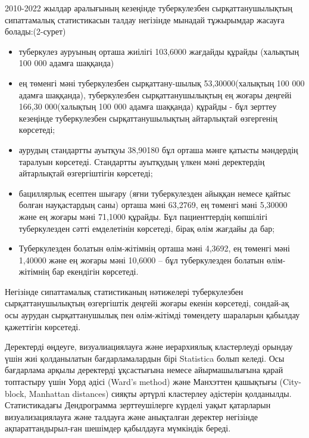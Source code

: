 \begin{multicols}{2}

2010-2022 жылдар аралығының кезеңінде туберкулезбен сырқаттанушылықтың
сипаттамалық статистикасын талдау негізінде мынадай тұжырымдар жасауға
болады:(2-сурет)

\begin{itemize}
  \setlength{\itemindent}{1cm}
\item
  туберкулез ауруының орташа жиілігі 103,6000 жағдайды құрайды (халықтың
  100 000 адамға шаққанда)
\item
  ең төменгі мәні туберкулезбен сырқаттану-шылық 53,30000(халықтың 100
  000 адамға шаққанда), туберкулезбен сырқаттанушылықтың ең жоғары
  деңгейі 166,30 000(халықтың 100 000 адамға шаққанда) құрайды - бұл
  зерттеу кезеңінде туберкулезбен сырқаттанушылықтың айтарлықтай
  өзгергенің көрсетеді;
\item
  аурудың стандартты ауытқуы 38,90180 бұл орташа мәнге қатысты мәндердің
  таралуын көрсетеді. Стандартты ауытқудың үлкен мәні деректердің
  айтарлықтай өзгергіштігін көрсетеді;
\item
  бациллярлық есептен шығару (яғни туберкулезден айыққан немесе қайтыс
  болған науқастардың саны) орташа мәні 63,2769, ең төменгі мәні 5,30000
  және ең жоғары мәні 71,1000 құрайды. Бұл пациенттердің көпшілігі
  туберкулезден сәтті емделетінін көрсетеді, бірақ өлім жағдайы да бар;
\item
  Туберкулезден болатын өлім-жітімнің орташа мәні 4,3692, ең төменгі
  мәні 1,40000 және ең жоғары мәні 10,6000 -- бұл туберкулезден болатын
  өлім-жітімнің бар екендігін көрсетеді.
\end{itemize}

Негізінде сипаттамалық статистиканың нәтижелері туберкулезбен
сырқаттанушылықтың өзгергіштік деңгейі жоғары екенін көрсетеді,
сондай-ақ осы аурудан сырқаттанушылық пен өлім-жітімді төмендету
шараларын қабылдау қажеттігін көрсетеді.

Деректерді өңдеуге, визуалиациялауға және иерархиялық кластерлеуді
орындау үшін жиі қолданылатын бағдарламалардын бірі Statistica болып
келеді. Осы бағдарлама арқылы деректерді ұқсастығына немесе
айырмашылығына қарай топтастыру үшін Уорд әдісі (Ward's method) және
Манхэттен қашықтығы (City-block, Manhattan distances) сияқты әртүрлі
кластерлеу әдістерін қолданылды. Статистикадағы Дендрограмма
зерттеушілерге күрделі уақыт қатарларын визуализациялауға және талдауға
және анықталған деректер негізінде ақпараттандырыл-ған шешімдер
қабылдауға мүмкіндік береді.
\end{multicols}

